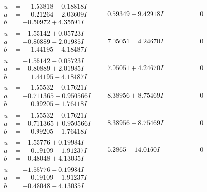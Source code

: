 \documentclass[1p]{elsarticle_modified}
\theoremstyle{definition}
\begin{document}
$$\begin{array}{c|c|c}
\begin{aligned}
u &= \phantom{-}1.53818 - 0.18818 I \\
a &= \phantom{-}0.21264 - 2.03609 I \\
b &= -0.50972 + 4.35591 I\end{aligned}
 & \phantom{-}0.59349 - 9.42918 I & \phantom{-0.000000 } 0 \\ \hline\begin{aligned}
u &= -1.55142 + 0.05723 I \\
a &= -0.80889 - 2.01985 I \\
b &= \phantom{-}1.44195 + 4.18487 I\end{aligned}
 & \phantom{-}7.05051 - 4.24670 I & \phantom{-0.000000 } 0 \\ \hline\begin{aligned}
u &= -1.55142 - 0.05723 I \\
a &= -0.80889 + 2.01985 I \\
b &= \phantom{-}1.44195 - 4.18487 I\end{aligned}
 & \phantom{-}7.05051 + 4.24670 I & \phantom{-0.000000 } 0 \\ \hline\begin{aligned}
u &= \phantom{-}1.55532 + 0.17621 I \\
a &= -0.711365 - 0.950566 I \\
b &= \phantom{-}0.99205 + 1.76418 I\end{aligned}
 & \phantom{-}8.38956 + 8.75469 I & \phantom{-0.000000 } 0 \\ \hline\begin{aligned}
u &= \phantom{-}1.55532 - 0.17621 I \\
a &= -0.711365 + 0.950566 I \\
b &= \phantom{-}0.99205 - 1.76418 I\end{aligned}
 & \phantom{-}8.38956 - 8.75469 I & \phantom{-0.000000 } 0 \\ \hline\begin{aligned}
u &= -1.55776 + 0.19984 I \\
a &= \phantom{-}0.19109 - 1.91237 I \\
b &= -0.48048 + 4.13035 I\end{aligned}
 & \phantom{-}5.2865 - 14.0160 I & \phantom{-0.000000 } 0 \\ \hline\begin{aligned}
u &= -1.55776 - 0.19984 I \\
a &= \phantom{-}0.19109 + 1.91237 I \\
b &= -0.48048 - 4.13035 I\end{aligned}

\end{array}$$
\end{document}
